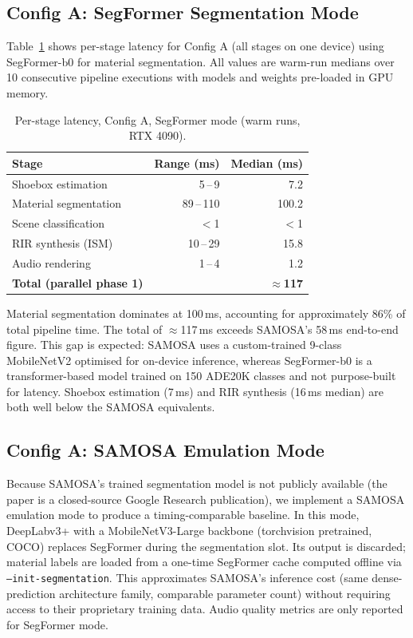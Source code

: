 \documentclass[11pt]{article}
\begin{document}
\subsection{Config A: SegFormer Segmentation Mode}

Table~\ref{tab:results} shows per-stage latency for Config A (all stages
on one device) using SegFormer-b0 for material segmentation. All values are
warm-run medians over 10 consecutive pipeline executions with models and
weights pre-loaded in GPU memory.

\begin{table}[H]
\small\centering
\caption{Per-stage latency, Config A, SegFormer mode (warm runs, RTX 4090).}
\label{tab:results}
\begin{tabular}{@{}lrr@{}}
\toprule
\textbf{Stage} & \textbf{Range (ms)} & \textbf{Median (ms)}\\
\midrule
Shoebox estimation     & 5\,--\,9    &  7.2\\
Material segmentation  & 89\,--\,110 & 100.2\\
Scene classification   & $<$1        & $<$1\\
RIR synthesis (ISM)    & 10\,--\,29  & 15.8\\
Audio rendering        & 1\,--\,4    &  1.2\\
\midrule
\textbf{Total (parallel phase 1)} & & \textbf{$\approx$117}\\
\bottomrule
\end{tabular}
\end{table}

Material segmentation dominates at 100\,ms, accounting for approximately
86\% of total pipeline time. The total of $\approx$117\,ms exceeds
SAMOSA's 58\,ms end-to-end figure. This gap is expected: SAMOSA uses a
custom-trained 9-class MobileNetV2 optimised for on-device inference,
whereas SegFormer-b0 is a transformer-based model trained on 150 ADE20K
classes and not purpose-built for latency. Shoebox estimation (7\,ms) and
RIR synthesis (16\,ms median) are both well below the SAMOSA equivalents.

\subsection{Config A: SAMOSA Emulation Mode}

Because SAMOSA's trained segmentation model is not publicly available
(the paper is a closed-source Google Research publication), we implement a
SAMOSA emulation mode to produce a timing-comparable baseline. In this mode,
DeepLabv3+ with a MobileNetV3-Large backbone (torchvision pretrained, COCO)
replaces SegFormer during the segmentation slot. Its output is discarded;
material labels are loaded from a one-time SegFormer cache computed
offline via \texttt{--init-segmentation}. This approximates SAMOSA's
inference cost (same dense-prediction architecture family, comparable parameter
count) without requiring access to their proprietary training data. Audio
quality metrics are only reported for SegFormer mode.
\end{document}
